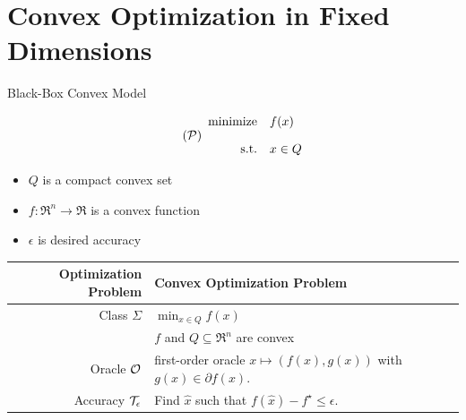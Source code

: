 \documentclass[9pt]{beamer}
\begin{document}
\section{Convex Optimization in Fixed Dimensions}

\begin{frame}{Black-Box Convex Model}

  \begin{minipage}{0.4\textwidth}
    \begin{equation}
      \label{opt:problem}
      \tag{$\mc P$}
      \begin{array}{rl}
        \minimize & f(x) \\[1em]
        \st & x \in Q
      \end{array}
    \end{equation}
  \end{minipage}%
  \hfill
  \begin{minipage}{0.55\textwidth}
    \begin{itemize}
    \item $Q$ is a compact convex set
    \item $f:\Re^n\to\Re$ is a convex function
    \item $\epsilon$ is desired accuracy
    \end{itemize}
  \end{minipage}

  \vfill
  
  \begin{center}
    \begin{tabular}{r|l}
      \hline
      Optimization Problem & Convex Optimization Problem \\[0.5em]
      \hline
      Class $\Sigma$ & $\min_{x\in Q} f(x)$ \\[0.5em]
      & $f$ and $Q\subseteq \Re^n$ are convex \\[0.5em]
      Oracle $\mathcal O$ & first-order oracle $x\mapsto (f(x), g(x))$ with $g(x)\in\partial f(x)$.\\[0.5em]
      Accuracy $\mathcal T_\epsilon$ & Find $\hat x$ such that $f(\hat x)-f^\star\leq\epsilon$.\\[0.5em]
      \hline
    \end{tabular}
  \end{center}
  
\end{frame}
\end{document}
